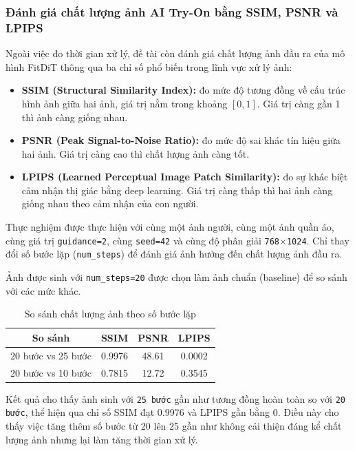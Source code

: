 \subsubsection{Đánh giá chất lượng ảnh AI Try-On bằng SSIM, PSNR và LPIPS}

Ngoài việc đo thời gian xử lý, đề tài còn đánh giá chất lượng ảnh đầu ra
của mô hình FitDiT thông qua ba chỉ số phổ biến trong lĩnh vực xử lý ảnh:

\begin{itemize}
    \item \textbf{SSIM (Structural Similarity Index):} đo mức độ tương đồng
    về cấu trúc hình ảnh giữa hai ảnh, giá trị nằm trong khoảng $[0,1]$.
    Giá trị càng gần 1 thì ảnh càng giống nhau.

    \item \textbf{PSNR (Peak Signal-to-Noise Ratio):} đo mức độ sai khác
    tín hiệu giữa hai ảnh. Giá trị càng cao thì chất lượng ảnh càng tốt.

    \item \textbf{LPIPS (Learned Perceptual Image Patch Similarity):}
    đo sự khác biệt cảm nhận thị giác bằng deep learning. Giá trị càng thấp
    thì hai ảnh càng giống nhau theo cảm nhận của con người.
\end{itemize}

Thực nghiệm được thực hiện với cùng một ảnh người, cùng một ảnh quần áo,
cùng giá trị \texttt{guidance=2}, cùng \texttt{seed=42} và cùng độ phân giải
\texttt{768$\times$1024}. Chỉ thay đổi số bước lặp (\texttt{num\_steps})
để đánh giá ảnh hưởng đến chất lượng ảnh đầu ra.

Ảnh được sinh với \texttt{num\_steps=20} được chọn làm ảnh chuẩn (baseline)
để so sánh với các mức khác.

\begin{table}[H]
\centering
\caption{So sánh chất lượng ảnh theo số bước lặp}
\label{tab:fitdit_quality}
\renewcommand{\arraystretch}{1.4}
\begin{tabular}{|c|c|c|c|}
\hline
\textbf{So sánh} & \textbf{SSIM} & \textbf{PSNR} & \textbf{LPIPS} \\
\hline
20 bước vs 25 bước & 0.9976 & 48.61 & 0.0002 \\
\hline
20 bước vs 10 bước & 0.7815 & 12.72 & 0.3545 \\
\hline
\end{tabular}
\end{table}

Kết quả cho thấy ảnh sinh với \texttt{25 bước} gần như tương đồng hoàn toàn
so với \texttt{20 bước}, thể hiện qua chỉ số SSIM đạt 0.9976 và LPIPS gần bằng 0.
Điều này cho thấy việc tăng thêm số bước từ 20 lên 25 gần như không cải thiện
đáng kể chất lượng ảnh nhưng lại làm tăng thời gian xử lý.


